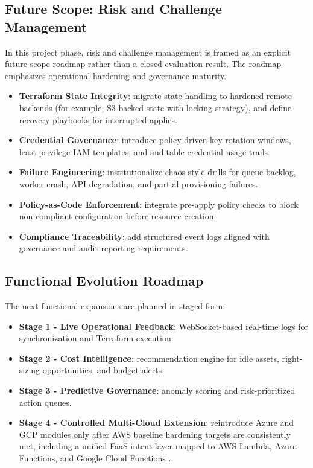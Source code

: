 \subsection{Future Scope: Risk and Challenge Management}
In this project phase, risk and challenge management is framed as an explicit future-scope roadmap rather than a closed evaluation result. The roadmap emphasizes operational hardening and governance maturity.

\begin{itemize}
    \item \textbf{Terraform State Integrity}: migrate state handling to hardened remote backends (for example, S3-backed state with locking strategy), and define recovery playbooks for interrupted applies.
    \item \textbf{Credential Governance}: introduce policy-driven key rotation windows, least-privilege IAM templates, and auditable credential usage trails.
    \item \textbf{Failure Engineering}: institutionalize chaos-style drills for queue backlog, worker crash, API degradation, and partial provisioning failures.
    \item \textbf{Policy-as-Code Enforcement}: integrate pre-apply policy checks to block non-compliant configuration before resource creation.
    \item \textbf{Compliance Traceability}: add structured event logs aligned with governance and audit reporting requirements.
\end{itemize}

\subsection{Functional Evolution Roadmap}
The next functional expansions are planned in staged form:
\begin{itemize}
    \item \textbf{Stage 1 - Live Operational Feedback}: WebSocket-based real-time logs for synchronization and Terraform execution.
    \item \textbf{Stage 2 - Cost Intelligence}: recommendation engine for idle assets, right-sizing opportunities, and budget alerts.
    \item \textbf{Stage 3 - Predictive Governance}: anomaly scoring and risk-prioritized action queues.
    \item \textbf{Stage 4 - Controlled Multi-Cloud Extension}: reintroduce Azure and GCP modules only after AWS baseline hardening targets are consistently met, including a unified FaaS intent layer mapped to AWS Lambda, Azure Functions, and Google Cloud Functions \cite{aws_lambda_docs_2026, azure_functions_docs_2026, gcp_cloud_functions_docs_2026}.
\end{itemize}

